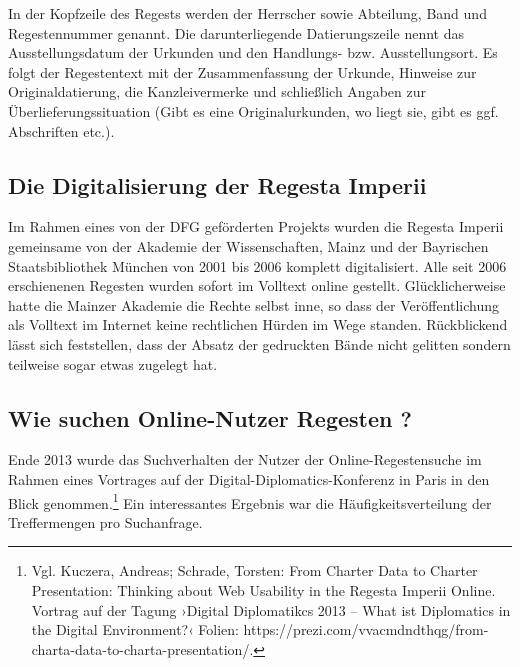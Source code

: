 In der Kopfzeile des Regests werden der Herrscher sowie Abteilung, Band
und Regestennummer genannt. Die darunterliegende Datierungszeile nennt
das Ausstellungsdatum der Urkunden und den Handlungs- bzw.
Ausstellungsort. Es folgt der Regestentext mit der Zusammenfassung der
Urkunde, Hinweise zur Originaldatierung, die Kanzleivermerke und
schließlich Angaben zur Überlieferungssituation (Gibt es eine
Originalurkunden, wo liegt sie, gibt es ggf. Abschriften etc.).

\hypertarget{die-digitalisierung-der-regesta-imperii}{%
\subsection{Die Digitalisierung der Regesta
Imperii}\label{die-digitalisierung-der-regesta-imperii}}

Im Rahmen eines von der DFG geförderten Projekts wurden die Regesta
Imperii gemeinsame von der Akademie der Wissenschaften, Mainz und der
Bayrischen Staatsbibliothek München von 2001 bis 2006 komplett
digitalisiert. Alle seit 2006 erschienenen Regesten wurden sofort im
Volltext online gestellt. Glücklicherweise hatte die Mainzer Akademie
die Rechte selbst inne, so dass der Veröffentlichung als Volltext im
Internet keine rechtlichen Hürden im Wege standen. Rückblickend lässt
sich feststellen, dass der Absatz der gedruckten Bände nicht gelitten
sondern teilweise sogar etwas zugelegt hat.

\hypertarget{wie-suchen-online-nutzer-regesten}{%
\subsection{Wie suchen Online-Nutzer Regesten
?}\label{wie-suchen-online-nutzer-regesten}}

Ende 2013 wurde das Suchverhalten der Nutzer der Online-Regestensuche im
Rahmen eines Vortrages auf der Digital-Diplomatics-Konferenz in Paris in
den Blick genommen.\footnote{Vgl. Kuczera, Andreas; Schrade, Torsten:
  From Charter Data to Charter Presentation: Thinking about Web
  Usability in the Regesta Imperii Online. Vortrag auf der Tagung
  ›Digital Diplomatikcs 2013 -- What ist Diplomatics in the Digital
  Environment?‹ Folien:
  https://prezi.com/vvacmdndthqg/from-charta-data-to-charta-presentation/.}
Ein interessantes Ergebnis war die Häufigkeitsverteilung der
Treffermengen pro Suchanfrage.

